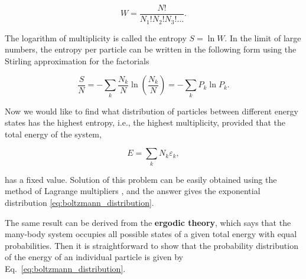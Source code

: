 \begin{equation}
    W = \frac{N!}{N_1!N_2!N_3!\ldots}.
    \label{eq:multiplicity}
\end{equation}

The logarithm of multiplicity is called the entropy $S = \ln W$. In the
limit of large numbers, the entropy per particle can be written in the
following form using the Stirling approximation for the factorials

\begin{equation}
    \frac{S}{N}
    =
    -\sum_k \frac{N_k}{N}
    \ln\left(\frac{N_k}{N}\right)
    =
    -\sum_k P_k \ln P_k.
    \label{eq:entropy}
\end{equation}

Now we would like to find what distribution of particles between
different energy states has the highest entropy, i.e., the highest
multiplicity, provided that the total energy of the system,

\begin{equation}
    E = \sum_k N_k \varepsilon_k,
\end{equation}

has a fixed value. Solution of this problem can be easily obtained using
the method of Lagrange multipliers \cite{Reif1985}, and the answer gives the
exponential distribution \eqref{eq:boltzmann_distribution}.

The same result can be derived from the \textbf{ergodic theory}, which
says that the many-body system occupies all possible states of a given
total energy with equal probabilities. Then it is straightforward to
show \cite{Reif1985} that the probability distribution of the energy of an
individual particle is given by Eq.~\eqref{eq:boltzmann_distribution}.


